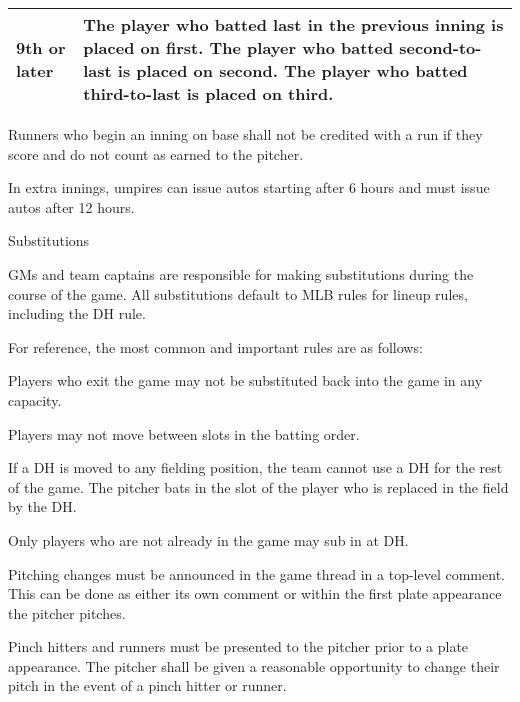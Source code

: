 \begin{deepEnumerate}
\begin{deepEnumerate}
\begin{center}
\begin{longtable}{|p{3cm}|p{8cm}|}
				\hline
				9th or later    & The player who batted last in the previous inning is placed on first. 
				The player who batted second-to-last is placed on second.
				The player who batted third-to-last is placed on third. \\
				\hline
			\end{longtable}
		\end{center}
		\item Runners who begin an inning on base shall not be credited with a run if they score and
		do not count as earned to the pitcher.
		\item In extra innings, umpires can issue autos starting after 6 hours and must issue autos after 12 hours.
	\end{deepEnumerate}
	\item Substitutions
	\label{sec:substitutions}
	\begin{deepEnumerate}
		\item GMs and team captains are responsible for making substitutions during the course of the game.
		All substitutions default to MLB rules for lineup rules, including the DH rule.
		\begin{deepEnumerate}
			\item For reference, the most common and important rules are as follows:
			\begin{deepEnumerate}
				\item Players who exit the game may not be substituted back into the game in any capacity.
				\item Players may not move between slots in the batting order.
				\item If a DH is moved to any fielding position, the team cannot use a DH for the rest of the game. 
				The pitcher bats in the slot of the player who is replaced in the field by the DH.
				\item Only players who are not already in the game may sub in at DH.
			\end{deepEnumerate}
		\end{deepEnumerate}
		\item Pitching changes must be announced in the game thread in a top-level comment.  
		This can be done as either its own comment or within the first plate appearance the pitcher pitches.
		\item Pinch hitters and runners must be presented to the pitcher prior to a plate appearance. 
		The pitcher shall be given a reasonable opportunity to change their pitch in the event of a pinch hitter or runner.
		\begin{deepEnumerate}

\end{deepEnumerate}
\end{deepEnumerate}
\end{deepEnumerate}
